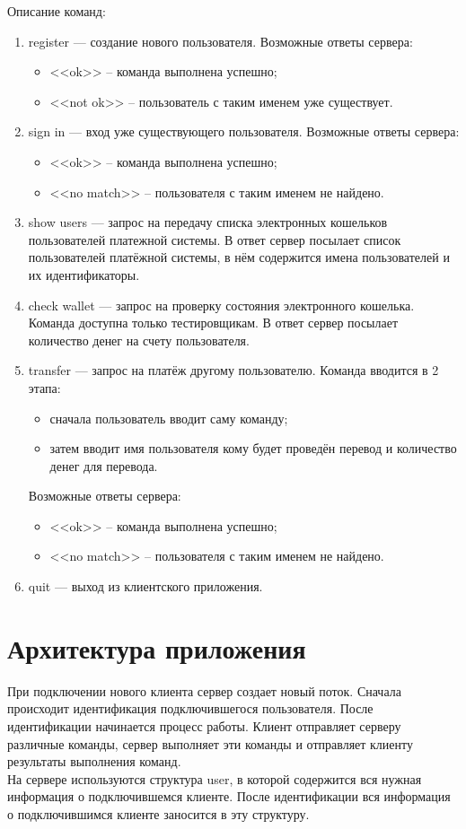 \documentclass[12pt,a4paper]{report}
\begin{document}
Описание команд:
	\begin{enumerate}
	\item register --- создание нового пользователя. Возможные ответы сервера:
		\begin{itemize}
		\item <<ok>> -- команда выполнена успешно;
		\item <<not ok>> -- пользователь с таким именем уже существует.
		\end{itemize}
	\item sign in --- вход уже существующего пользователя. Возможные ответы сервера:
		\begin{itemize}
		\item <<ok>> -- команда выполнена успешно;
		\item <<no match>> -- пользователя с таким именем не найдено.
		\end{itemize}
	\item show users --- запрос на передачу списка электронных кошельков
пользователей платежной системы. В ответ сервер посылает список пользователей платёжной системы, в нём содержится имена пользователей и их идентификаторы.
	\item check wallet --- запрос на проверку состояния электронного кошелька. Команда доступна только тестировщикам. В ответ сервер посылает количество денег на счету пользователя.
	\item transfer --- запрос на платёж другому пользователю. Команда вводится в 2 этапа: 
		\begin{itemize}
		\item сначала пользователь вводит саму команду;
		\item затем вводит имя пользователя кому будет проведён перевод и количество денег для перевода.
		\end{itemize}
		Возможные ответы сервера:
		\begin{itemize}
		\item <<ok>> -- команда выполнена успешно;
		\item <<no match>> -- пользователя с таким именем не найдено.
		\end{itemize}
	\item quit --- выход из клиентского приложения.
	\end{enumerate}

\section{Архитектура приложения}
\label{architechture_tcp}
При подключении нового клиента сервер создает новый поток. Сначала происходит идентификация подключившегося пользователя. После идентификации начинается процесс работы. Клиент отправляет серверу различные команды, сервер выполняет эти команды и отправляет клиенту результаты выполнения команд.\\
На сервере используются структура user, в которой содержится вся нужная информация о подключившемся клиенте. После идентификации вся информация о подключившимся клиенте заносится в эту структуру.\\
\end{document}
